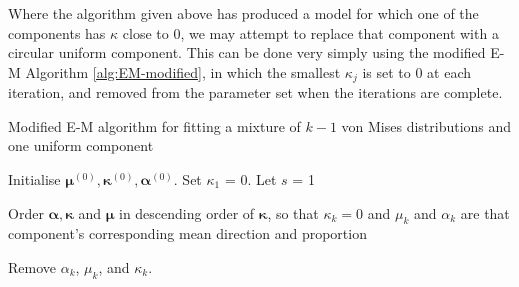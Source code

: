 \documentclass[../../ArchStats.tex]{subfiles}
\begin{document}
Where the algorithm given above has produced a model for which one of the components has $\kappa$ close to 0, we may attempt to replace that component with a circular uniform component. This can be done very simply using the modified E-M Algorithm \ref{alg:EM-modified}, in which the smallest $\kappa_j$ is set to 0 at each iteration, and removed from the parameter set when the iterations are complete. 

\begin{algorithm}[h!]
    \caption{Modified E-M algorithm for fitting a mixture of $k-1$ von Mises distributions and one uniform component}
	\label{alg:EM-modified}



Initialise $\boldsymbol{\mu}^{(0)}, \boldsymbol{\kappa}^{(0)}, \boldsymbol{\alpha}^{(0)}$. Set $\kappa_1$ = 0. Let $s$ = 1\;


Order $\boldsymbol{\alpha}, \boldsymbol{\kappa}$ and $\boldsymbol{\mu}$ in descending order of $\boldsymbol{\kappa}$, so that $\kappa_k = 0$ and $\mu_k$ and $\alpha_k$ are that component's corresponding mean direction and proportion\;

Remove $\alpha_k$, $\mu_k$, and $\kappa_k$.
\end{algorithm}
\end{document}
